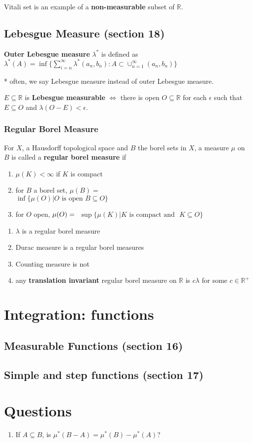 \documentclass[a4paper, 12pt]{article}
\def\R{\ensuremath{\mathbb{R}}} %
\newcommand{\bt}[1]{\textbf{#1}} %
\begin{document}
\begin{multicols}{2}
Vitali set is an example of a \bt{non-measurable} subset of $\R$.

\subsection{Lebesgue Measure (section 18)}

\bt{Outer Lebesgue measure} $\lambda^*$ is defined as 
$\lambda^*(A) = \inf \{ \sum_{i=n}^\infty \lambda^*(a_n, b_n) : A \subset \cup_{n=1}^\infty (a_n, b_n)\}$ 

* often, we say Lebesgue measure instead of outer Lebesgue measure. 

$E \subseteq \R$ is \bt{Lebesgue measurable} $\iff$ there is open $O \subseteq \R$ for each $\epsilon$ such that 
$E \subseteq O$ and $\lambda(O - E) < \epsilon$.


\subsubsection{Regular Borel Measure}
For $X$, a Hausdorff topological space and $B$ the borel sets in $X$, 
a measure $\mu$ on $B$ is called a \bt{regular borel measure} if 
\begin{enumerate}
    \item $\mu(K) < \infty$ if $K$ is compact 
    \item for $B$ a borel set, $\mu(B) =$\\ $\inf \{\mu(O) | O \text{ is open } B \subseteq O\}$ 
    \item for $O$ open, $\mu(O) = \\$  $\sup\{\mu(K) | K \text{ is compact and }$ $K \subseteq O\}$
\end{enumerate}

\begin{enumerate}
    \item $\lambda$ is a regular borel measure
    \item Durac measure is a regular borel measures
    \item Counting measure is not
    \item any \bt{translation invariant} regular borel measure on $\R$ is 
    $c \lambda$ for some $c \in \R^+$
\end{enumerate}

\section{Integration: functions}

\subsection{Measurable Functions (section 16)}
\subsection{Simple and step functions (section 17)}


\end{multicols}

\section{Questions}
\begin{enumerate}
    \item If $A \subseteq B$, is $\mu^*(B-A) = \mu^*(B) - \mu^*(A)$?
\end{enumerate}
\end{document}
